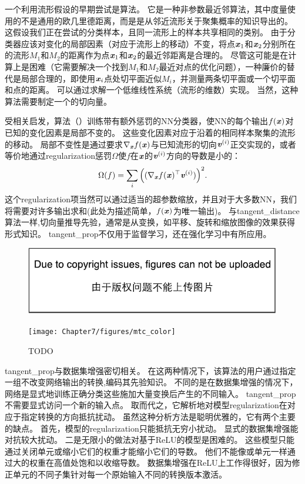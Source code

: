 一个利用流形假设的早期尝试是算法\citep{Simard93-small,Simard98}。
它是一种非参数最近邻算法，其中度量使用的不是通用的欧几里德距离，而是是从邻近流形关于聚集概率的知识导出的。
这假设我们正在尝试的分类样本，且同一流形上的样本共享相同的类别。
由于分类器应该对变化的局部因素（对应于流形上的移动）不变，将点$\boldsymbol{\mathit{x}}_1$和$\boldsymbol{\mathit{x}}_2$分别所在的流形$M_1$和$M_2$的距离作为点$\boldsymbol{\mathit{x}}_1$和$\boldsymbol{\mathit{x}}_2$的最近邻距离是合理的。
尽管这可能是在计算上是困难（它需要解决一个找到$M_1$和$M_2$最近对点的优化问题），一种廉价的替代是局部合理的，即使用$\boldsymbol{\mathit{x}}_i$点处切平面近似$M_i$，并测量两条切平面或一个切平面和点的距离。
可以通过求解一个低维线性系统（流形的维数）实现。
当然，这种算法需要制定一个的切向量。

受相关启发，算法\citep{Simard92-short}（）训练带有额外惩罚的\gls{NN}分类器，使\gls{NN}的每个输出$f(\boldsymbol{\mathit{x}})$对已知的变化因素是局部不变的。
这些变化因素对应于沿着的相同样本聚集的流形的移动。
局部不变性是通过要求$\nabla_{\boldsymbol{\mathit{x}}} f(\boldsymbol{\mathit{x}})$与已知流形的切向$\boldsymbol{\mathit{v}}^{(i)}$正交实现的，或者等价地通过\gls{regularization}惩罚$\Omega$使$f$在$\boldsymbol{\mathit{x}}$的$\boldsymbol{\mathit{v}}^{(i)}$方向的导数是小的：
\begin{align} \label{eq:767}
 \Omega(f) = \sum_i \Big((\nabla_{\boldsymbol{\mathit{x}}} f(\boldsymbol{\mathit{x}})^\top \boldsymbol{\mathit{v}}^{(i)}) \Big)^2 .
\end{align}
这个\gls{regularization}项当然可以通过适当的超参数缩放，并且对于大多数\gls{NN}，我们将需要对许多输出求和(此处为描述简单，$f(\boldsymbol{\mathit{x}})$为唯一输出)。
与\gls{tangent_distance}算法一样,切向量推导先验，通常是从变换，如平移、旋转和缩放图像的效果获得形式知识。
\gls{tangent_prop}不仅用于监督学习\citep{Simard92-short}，还在强化学习\citep{Thrun-NIPS1994}中有所应用。
\begin{figure}[!htb]
\ifOpenSource
\centerline{\includegraphics{figure.pdf}}
\else
\centerline{\texttt{[image: Chapter7/figures/mtc\_color]}}
\fi
\caption{TODO}
\label{fig:chap7_mtc_color}
\end{figure}

\gls{tangent_prop}与数据集增强密切相关。
在这两种情况下，该算法的用户通过指定一组不改变网络输出的转换,编码其先验知识。
不同的是在数据集增强的情况下，网络是显式地训练正确分类这些施加大量变换后产生的不同输入。
\gls{tangent_prop}不需要显式访问一个新的输入点。
取而代之，它解析地对模型\gls{regularization}在对应于指定转换的方向抵抗扰动。
虽然这种分析方法是聪明优雅的，它有两个主要的缺点。
首先，模型的\gls{regularization}只能抵抗无穷小扰动。
显式的数据集增强能对抗较大扰动。
二是无限小的做法对基于\gls{ReLU}的模型是困难的。
这些模型只能通过关闭单元或缩小它们的权重才能缩小它们的导数。
他们不能像或单元一样通过大的权重在高值处饱和以收缩导数。
数据集增强在\gls{ReLU}上工作得很好，因为修正单元的不同子集针对每一个原始输入不同的转换版本激活。

